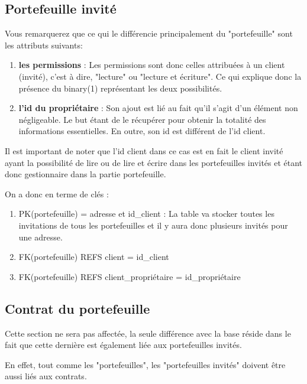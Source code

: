 \newpage
\subsection{Portefeuille invité}
\begin{flushleft}
Vous remarquerez que ce qui le différencie principalement du "portefeuille" sont les attributs suivants:
\end{flushleft}
\begin{enumerate}
\item \textbf{les permissions }: \newline
Les permissions sont donc celles attribuées à un client (invité), c'est à dire, "lecture" ou "lecture et écriture". \newline
Ce qui explique donc la présence du binary(1) représentant les deux possibilités.

\item \textbf{l'id du propriétaire} :\newline
Son ajout est lié au fait qu'il s'agit d'un élément non négligeable. \newline 
Le but étant de le récupérer pour obtenir la totalité des informations essentielles.\newline
En outre, son id est différent de l'id client.
\end{enumerate}

\begin{flushleft}
Il est important de noter que l'id client dans ce cas est en fait le client invité ayant la possibilité de lire ou de lire et écrire dans les portefeuilles invités et étant donc gestionnaire dans la partie portefeuille.
\end{flushleft}

\begin{flushleft}
On a donc en terme de clés :
\end{flushleft}

\begin{enumerate}
\item PK(portefeuille) = adresse et id\_client :\newline
La table va stocker toutes les invitations de tous les portefeuilles et il y aura donc plusieurs invités pour une adresse.
\item FK(portefeuille) REFS client = id\_client
\item FK(portefeuille) REFS client\_propriétaire = id\_propriétaire
\end{enumerate}

\subsection{Contrat du portefeuille}
\begin{flushleft}
Cette section ne sera pas affectée, la seule différence avec la base réside dans le fait que cette dernière est également liée aux portefeuilles invités.
\end{flushleft}
\begin{flushleft}
En effet, tout comme les "portefeuilles", les "portefeuilles invités" doivent être aussi liés aux contrats.
\end{flushleft}

